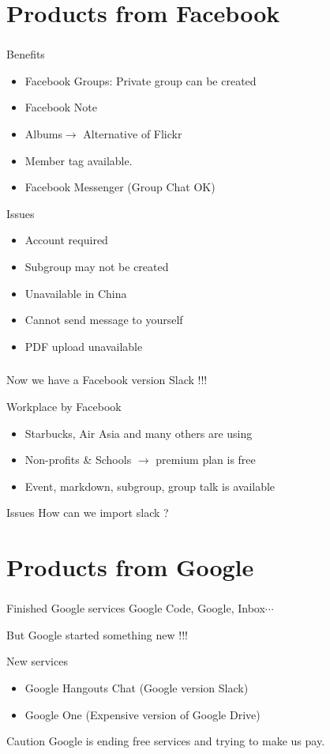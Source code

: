 \documentclass[dvipdfmx,10pt]{beamer}
\newcommand{\bb}{\begin{block}}
\newcommand{\eb}{\end{block}}
\newcommand{\bit}{\begin{itemize}}
\newcommand{\eit}{\end{itemize}}
\newcommand{\ft}{\frametitle}
\begin{document}
\section{Products from Facebook}
\begin{frame}\ft{\insertsection}
\footnotesize
\bb{\small Benefits}
\bit
\item Facebook Groups: Private group can be created
\item Facebook Note
\item Albums$\to$ Alternative of Flickr
\item Member tag available.
\item Facebook Messenger (Group Chat OK)
\eit
\eb
\bb{\small Issues}
\bit
\item Account required
\item Subgroup may not be created
\item Unavailable in China
\item Cannot send message to yourself
\item PDF upload unavailable
\eit
\eb
\normalsize
\end{frame}

\begin{frame}\ft{\insertsection}
Now we have a Facebook version Slack !!!
\bb{Workplace by Facebook}
\bit
\item Starbucks, Air Asia and many others are using
\item Non-profits \& Schools $\to$ premium plan is free
\item Event, markdown, subgroup, group talk is available
\eit
\eb
\bb{Issues}
How can we import slack ?
\eb
\end{frame}
\section{Products from Google}
\begin{frame}\ft{\insertsection}
\footnotesize
\bb{Finished Google services}
Google Code, Google, Inbox$\cdots$
\eb
But Google started something new !!!
\bb{New services}
\bit
\item Google Hangouts Chat (Google version Slack)
\item Google One (Expensive version of Google Drive)
\eit
\eb
\bb{Caution}
Google is ending free services and trying to make us pay.
\eb
\normalsize
\end{frame}
\end{document}
